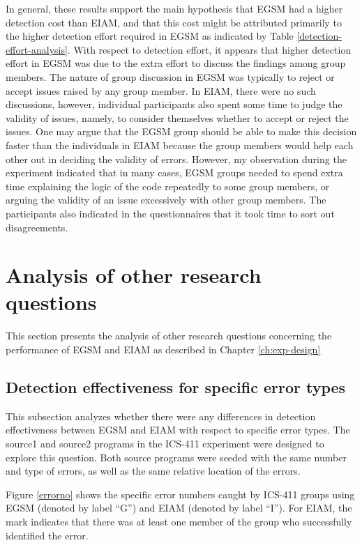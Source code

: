 In general, these results support the main hypothesis
that EGSM had a higher detection cost than EIAM, and that this cost
might be attributed primarily to the higher detection effort required
in EGSM as indicated by Table \ref{detection-effort-analysis}.  With
respect to 
detection effort, it appears that higher detection effort in EGSM was
due to the extra effort to discuss the findings among group members. 
The nature of group discussion in
 EGSM was typically to reject or accept issues raised by any group member. In
EIAM, there were no such discussions, however, individual participants also
spent some time to judge the validity of issues, namely, to consider
themselves whether to accept or reject the issues. One may
argue that the EGSM group should be 
able to make this decision faster than the individuals in EIAM because
the group members would help each other out in deciding the validity
of errors. 
However, my observation during the experiment indicated that in many
cases, EGSM
groups needed to spend extra time explaining the logic of the code
repeatedly to some group members, or 
arguing the validity of an issue excessively with other group members.
The participants also indicated in the questionnaires that it took
time  to sort out disagreements.

\section {Analysis of other research questions}
\label{sec:other-research-question}
This section presents the analysis of other research questions
concerning the performance of EGSM and EIAM as described in Chapter
\ref{ch:exp-design} 

\subsection{Detection effectiveness for specific error types}
\label{sec:error-type}
This subsection analyzes whether  there were any differences in
detection effectiveness between EGSM and EIAM with respect
to specific error types. The source1 and source2 programs in the ICS-411
experiment were designed to explore this question. 
Both source programs were seeded with the
same number and type of errors, as well as the same relative
location of the errors.

Figure \ref{errorno} shows the specific error numbers caught
by ICS-411 
groups using EGSM (denoted by label ``G'')  and EIAM (denoted by label
``I''). For EIAM, the mark indicates that there was at least one
member of the group who successfully identified the error.

